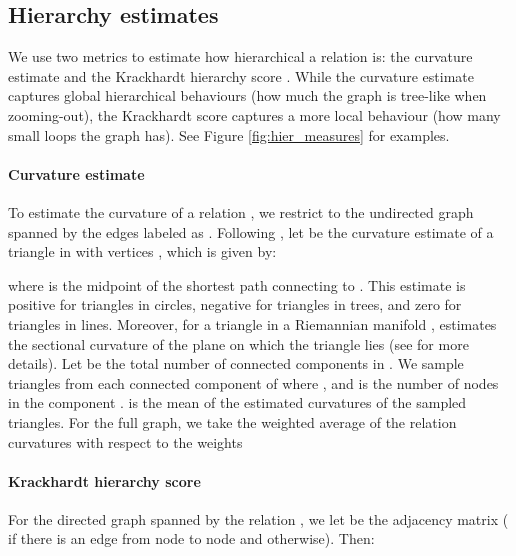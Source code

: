 \documentclass[11pt,a4paper]{article}
\begin{document}
\subsection{Hierarchy estimates}\label{subsec:curvature_est}
We use two metrics to estimate how hierarchical a relation is: the curvature estimate  and the Krackhardt hierarchy score . While the curvature estimate captures global hierarchical behaviours (how much the graph is tree-like when zooming-out), the Krackhardt score captures a more local behaviour (how many small loops the graph has). See Figure \ref{fig:hier_measures} for examples. 

\paragraph{Curvature estimate} To estimate the curvature of a relation , we restrict to the undirected graph  spanned by the edges labeled as . Following \cite{gu2019mixed}, let  be the curvature estimate of a triangle in  with vertices , which is given by:

where  is the midpoint of the shortest path connecting  to . This estimate is positive for triangles in circles, negative for triangles in trees, and zero for triangles in lines. Moreover, for a triangle in a Riemannian manifold ,  estimates the sectional curvature of the plane on which the triangle lies (see \cite{gu2019mixed} for more details). Let  be the total number of connected components in . We sample  triangles from each connected component  of  where , and  is the number of nodes in the component .  is the mean of the estimated curvatures of the sampled triangles. For the full graph, we take the weighted average of the relation curvatures  with respect to the weights 

\paragraph{Krackhardt hierarchy score}
For the directed graph  spanned by the relation , we let  be the adjacency matrix ( if there is an edge from node  to node  and  otherwise). 
Then: 
\end{document}
